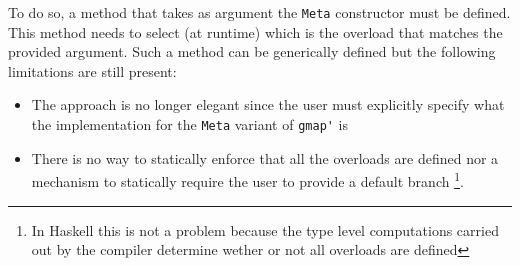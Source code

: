 \documentclass[8pt]{extarticle}
\begin{document}
To do so, a method that takes as argument the \verb+Meta+ constructor must be defined. This method needs to select (at runtime) which is the overload that matches the provided argument. Such a method can be generically defined but the following limitations are still present:
\begin{itemize}
\item The approach is no longer elegant since the user must explicitly specify what the implementation for the \verb+Meta+ variant of \verb+gmap'+ is
\item There is no way to statically enforce that all the overloads are defined nor a mechanism to statically require the user to provide a default branch \footnote{In Haskell this is not a problem because the type level computations carried out by the compiler determine wether or not all overloads are defined}.
\end{itemize}
\end{document}
